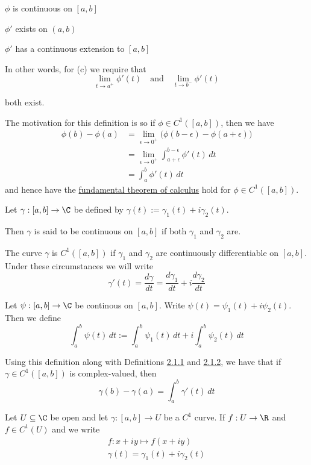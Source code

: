 \begin{enumerata}
  \item $\phi$ is continuous on $[a,b]$
  \item $\phi'$ exists on $(a,b)$
  \item $\phi'$ has a continuous extension to $[a,b]$
\end{enumerata}

In other words, for (c) we require that
$$
  \lim_{t\to a^+}\phi'(t)\quad\text{and}\quad\lim_{t\to b^-}\phi'(t)
$$

both exist.

The motivation for this definition is so if $\phi\in C^1([a,b])$, then we have
\begin{align*}
  \phi(b)-\phi(a)
   & =\lim_{\epsilon\to0^+}\big(\phi(b-\epsilon)-\phi(a+\epsilon)\big) \\
   & =\lim_{\epsilon\to0^+}\int_{a+\epsilon}^{b-\epsilon}\phi'(t)\,dt  \\
   & =\int_a^b\phi'(t)\,dt
\end{align*}
and hence have the \href{b869dc0}{fundamental theorem of calculus}
hold for $\phi\in C^1([a,b])$.

\label{e4132bc}

Let $\gamma:[a,b]\to\C$ be defined by $\gamma(t):=\gamma_1(t) + i\gamma_2(t)$.

Then $\gamma$ is said to be continuous on $[a,b]$ if both $\gamma_1$ and
$\gamma_2$ are.

The curve $\gamma$ is $C^1([a,b])$ if $\gamma_1$ and $\gamma_2$ are
continuously differentiable on $[a,b]$. Under these circumstances we will write
$$
  \gamma'(t)=\frac{d\gamma}{dt}=\frac{d\gamma_1}{dt}+i\frac{d\gamma_2}{dt}
$$

\label{c511702}

Let $\psi:[a,b]\to\C$ be continous on $[a,b]$. Write
$\psi(t)=\psi_1(t)+i\psi_2(t)$. Then we define
$$
  \int_a^b\psi(t)\,dt:=\int_a^b\psi_1(t)\,dt+i\int_a^b\psi_2(t)\,dt
$$

Using this definition along with Definitions \href{c1f6d35}{2.1.1} and
\href{e4132bc}{2.1.2}, we have that if $\gamma\in C^1([a,b])$ is
complex-valued, then
$$
  \gamma(b)-\gamma(a)=\int_a^b\gamma'(t)\,dt
$$

\label{f37b676}

Let $U\subseteq\C$ be open and let $\gamma:[a,b]\to U$ be a $C^1$ curve. If
$f:U\to\R$ and $f\in C^1(U)$ and we write
\begin{gather*}
  f:x+iy\mapsto f(x+iy) \\
  \gamma(t)=\gamma_1(t)+i\gamma_2(t)
\end{gather*}

